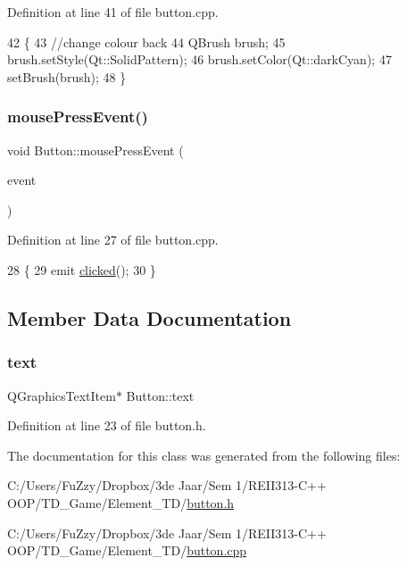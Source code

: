 Definition at line 41 of file button.\+cpp.


\begin{DoxyCode}
42 \{
43     \textcolor{comment}{//change colour back}
44     QBrush brush;
45     brush.setStyle(Qt::SolidPattern);
46     brush.setColor(Qt::darkCyan);
47     setBrush(brush);
48 \}
\end{DoxyCode}
\mbox{\label{class_button_a17d8eb0c904605b223bbc00c75655315}} 
\subsubsection{\texorpdfstring{mouse\+Press\+Event()}{mousePressEvent()}}
{\footnotesize\ttfamily void Button\+::mouse\+Press\+Event (\begin{DoxyParamCaption}\item[{Q\+Graphics\+Scene\+Mouse\+Event $\ast$}]{event }\end{DoxyParamCaption})}



Definition at line 27 of file button.\+cpp.


\begin{DoxyCode}
28 \{
29     emit \hyperlink{class_button_a9e7ab4152cb1e7e3beb7f2842f32670c}{clicked}();
30 \}
\end{DoxyCode}


\subsection{Member Data Documentation}
\mbox{\label{class_button_a0d566bacc8c1befef9d09b839b6e76e6}} 
\subsubsection{\texorpdfstring{text}{text}}
{\footnotesize\ttfamily Q\+Graphics\+Text\+Item$\ast$ Button\+::text\hspace{0.3cm}{\ttfamily [private]}}



Definition at line 23 of file button.\+h.



The documentation for this class was generated from the following files\+:\begin{DoxyCompactItemize}
\item 
C\+:/\+Users/\+Fu\+Zzy/\+Dropbox/3de Jaar/\+Sem 1/\+R\+E\+I\+I313-\/\+C++ O\+O\+P/\+T\+D\+\_\+\+Game/\+Element\+\_\+\+T\+D/\hyperlink{button_8h}{button.\+h}\item 
C\+:/\+Users/\+Fu\+Zzy/\+Dropbox/3de Jaar/\+Sem 1/\+R\+E\+I\+I313-\/\+C++ O\+O\+P/\+T\+D\+\_\+\+Game/\+Element\+\_\+\+T\+D/\hyperlink{button_8cpp}{button.\+cpp}\end{DoxyCompactItemize}

